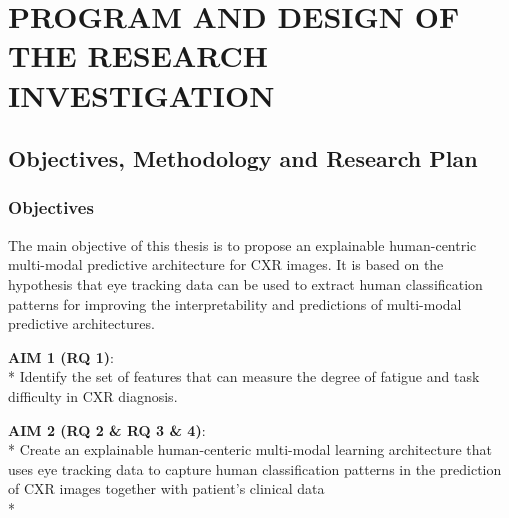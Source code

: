 \section{PROGRAM AND DESIGN OF THE RESEARCH INVESTIGATION}
\label{sec:research-design}

\subsection{Objectives, Methodology and Research Plan}

\subsubsection{Objectives}

The main objective of this thesis is to propose an explainable human-centric multi-modal predictive architecture for CXR images. It is based on the hypothesis that eye tracking data can be used to extract human classification patterns for improving the interpretability and predictions of multi-modal predictive architectures.


\noindent
\textbf{AIM 1 (RQ 1)}:\\*
Identify the set of features that can measure the degree of fatigue and task difficulty in CXR diagnosis.


\noindent
\textbf{AIM 2 (RQ 2 \& RQ 3 \& 4)}:\\*
Create an explainable human-centeric multi-modal learning architecture that uses eye tracking data to capture human classification patterns in the prediction of CXR images together with patient's clinical data \\*



